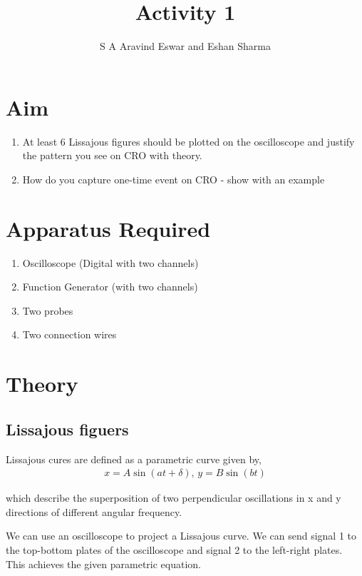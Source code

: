 \documentclass[journal]{IEEEtran}
\begin{document}

\vspace{3cm}

\title{Activity 1} 
\author{S A Aravind Eswar and Eshan Sharma}
{\let\newpage\relax\maketitle}

\section{Aim}
\begin{enumerate}
    \item At least 6 Lissajous figures should be plotted on the oscilloscope and justify the pattern you see on CRO with theory.
    \item How do you capture one-time event on CRO -  show with an example
\end{enumerate}

\section{Apparatus Required}
\begin{enumerate}
    \item Oscilloscope (Digital with two channels)
    \item Function Generator (with two channels)
    \item Two probes
    \item Two connection wires
\end{enumerate}

\section{Theory}
\subsection{Lissajous figuers}

Lissajous cures are defined as a parametric curve given by,
\begin{align}
    x = A\sin(at+\delta),\,y = B\sin(bt)
\end{align}

which describe the superposition of two perpendicular oscillations in x and y directions of different angular frequency.

We can use an oscilloscope to project a Lissajous curve. We can send signal 1 to the top-bottom plates of the oscilloscope and signal 2 to the left-right plates. This achieves the given parametric equation.
\end{document}
